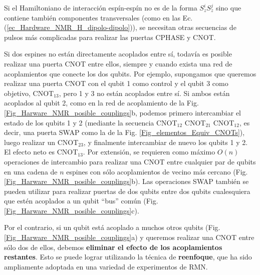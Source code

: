 Si el Hamiltoniano de interacción espín-espín no es de la forma $S_z^i S_z^j$ sino que contiene también componentes transversales (como en las Ec. (\ref{ec_Hardware_NMR_H_dipolo-dipolo})), se necesitan otras secuencias de pulsos más complicadas para realizar las puertas CPHASE y CNOT.

Si dos espines no están directamente acoplados entre sí, todavía es posible realizar una puerta CNOT entre ellos, siempre y cuando exista una red de acoplamientos que conecte los dos qubits. Por ejemplo, supongamos que queremos realizar una puerta CNOT con el qubit 1 como control y el qubit 3 como objetivo, CNOT$_{13}$, pero 1 y 3 no están acoplados entre sí. Si ambos están acoplados al qubit 2, como en la red de acoplamiento de la Fig. \ref{Fig_Harware_NMR_posible_couplings}b, podemos primero intercambiar el estado de los qubits 1 y 2 (mediante la secuencia CNOT$_{12}$ CNOT$_{21}$ CNOT$_{12}$, es decir, una puerta SWAP como la de la Fig. \ref{Fig_elementos_Equiv_CNOTs}), luego realizar un CNOT$_{23}$, y finalmente intercambiar de nuevo los qubits 1 y 2. El efecto neto es CNOT$_{13}$. Por extensión, se requieren como máximo $O(n)$ operaciones de intercambio para realizar una CNOT entre cualquier par de qubits en una cadena de $n$ espines con sólo acoplamientos de vecino más cercano (Fig. \ref{Fig_Harware_NMR_posible_couplings}b). Las operaciones SWAP también se pueden utilizar para realizar puertas de dos qubits entre dos qubits cualesquiera que estén acoplados a un qubit ``bus'' común (Fig. \ref{Fig_Harware_NMR_posible_couplings}c).

Por el contrario, si un qubit está acoplado a muchos otros qubits (Fig. \ref{Fig_Harware_NMR_posible_couplings}a) y queremos realizar una CNOT entre sólo dos de ellos, debemos \textbf{eliminar el efecto de los acoplamientos restantes}. Esto se puede lograr utilizando la técnica de \textbf{reenfoque}, que ha sido ampliamente adoptada en una variedad de experimentos de RMN.



